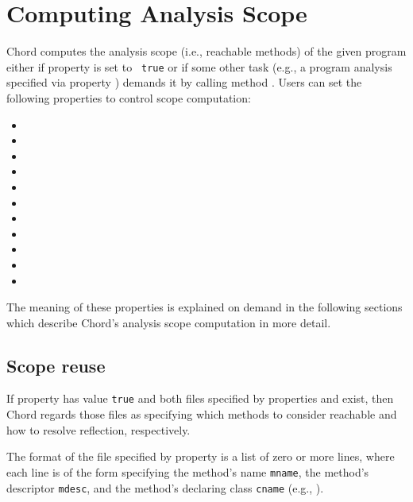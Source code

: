 \section{Computing Analysis Scope}
\label{sec:computing-scope}

Chord computes the analysis scope (i.e., reachable methods) of the given
program either if property  is set to {\tt
  true} or if some other task (e.g., a program analysis specified via
property ) demands it by calling method
.
Users can set the following properties to control scope computation:

\begin{itemize}
\item {}
\item {}
\item {}
\item {}
\item {}
\item {}
\item {}
\item {}
\item {}
\item {}
\item {}
\end{itemize}

\noindent The meaning of these properties is explained on demand in
the following sections which describe Chord's analysis scope 
computation in more detail.

\subsection{Scope reuse}

If property  has value {\tt true} and both
files specified by properties  and
 exist, then Chord regards those files as
specifying which methods to consider reachable and how to resolve
reflection, respectively.

The format of the file specified by property 
is a list of zero or more lines, where each line is of the form
specifying the method's name {\tt mname}, the method's descriptor
{\tt mdesc}, and the method's declaring class {\tt cname} (e.g.,
\code{main:([Ljava/lang/String;)V@foo.bar.Main}).

